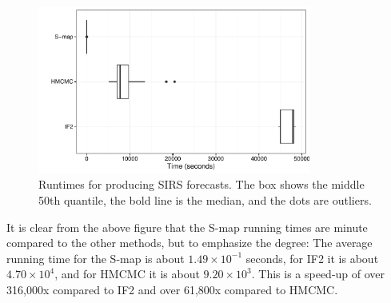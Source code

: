 \documentclass[12pt]{article}
\begin{document}
    \begin{figure}[H]
        \centering
        \captionsetup{width=.8\linewidth}
        \includegraphics[width=0.8\textwidth]{./images/timeplot.pdf}
        \caption{Runtimes for producing SIRS forecasts. The box shows the middle 50th quantile, the bold line is the median, and the dots are outliers.}
        \label{timeplot}
    \end{figure}

    It is clear from the above figure that the S-map running times are minute compared to the other methods, but to emphasize the degree: The average running time for the S-map is about $1.49 \times 10^{-1}$ seconds, for IF2 it is about $4.70 \times 10^{4}$, and for HMCMC it is about $9.20 \times 10^{3}$. This is a speed-up of over 316,000x compared to IF2 and over 61,800x compared to HMCMC.


	
\end{document}
